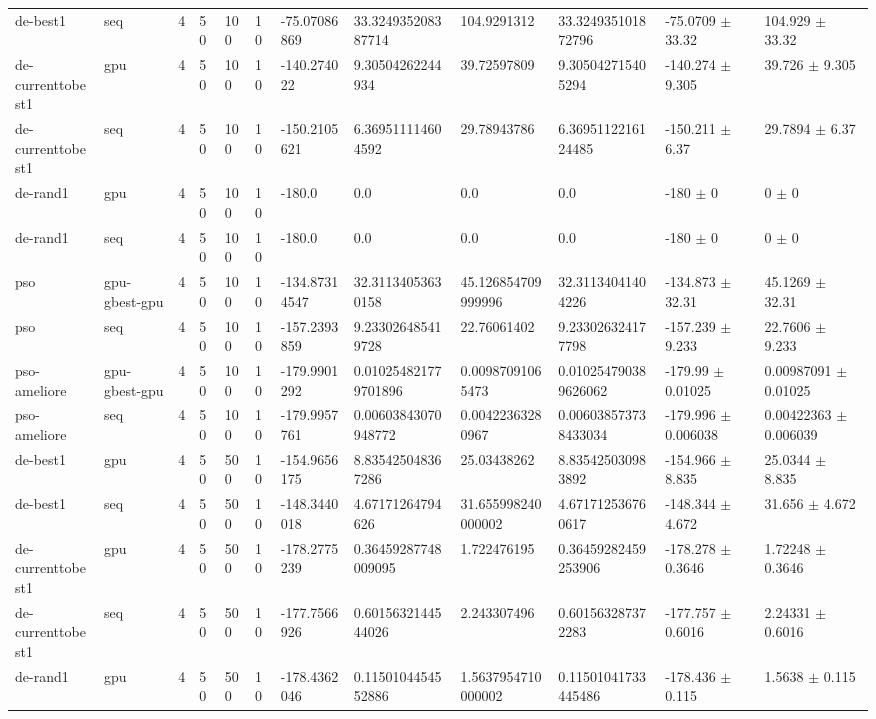 \begin{table}[t]
\begin{tabular}{llllllllllll}
de-best1 & seq & 4 & 50 & 100 & 10 & -75.07086869 & 33.324935208387714 & 104.9291312 & 33.324935101872796 & -75.0709 $\pm$ 33.32 & 104.929 $\pm$ 33.32 \\
de-currenttobest1 & gpu & 4 & 50 & 100 & 10 & -140.274022 & 9.30504262244934 & 39.72597809 & 9.305042715405294 & -140.274 $\pm$ 9.305 & 39.726 $\pm$ 9.305 \\
de-currenttobest1 & seq & 4 & 50 & 100 & 10 & -150.2105621 & 6.369511114604592 & 29.78943786 & 6.3695112216124485 & -150.211 $\pm$ 6.37 & 29.7894 $\pm$ 6.37 \\
de-rand1 & gpu & 4 & 50 & 100 & 10 & -180.0 & 0.0 & 0.0 & 0.0 & -180 $\pm$ 0 & 0 $\pm$ 0 \\
de-rand1 & seq & 4 & 50 & 100 & 10 & -180.0 & 0.0 & 0.0 & 0.0 & -180 $\pm$ 0 & 0 $\pm$ 0 \\
pso & gpu-gbest-gpu & 4 & 50 & 100 & 10 & -134.87314547 & 32.31134053630158 & 45.126854709999996 & 32.31134041404226 & -134.873 $\pm$ 32.31 & 45.1269 $\pm$ 32.31 \\
pso & seq & 4 & 50 & 100 & 10 & -157.2393859 & 9.233026485419728 & 22.76061402 & 9.233026324177798 & -157.239 $\pm$ 9.233 & 22.7606 $\pm$ 9.233 \\
pso-ameliore & gpu-gbest-gpu & 4 & 50 & 100 & 10 & -179.9901292 & 0.010254821779701896 & 0.00987091065473 & 0.010254790389626062 & -179.99 $\pm$ 0.01025 & 0.00987091 $\pm$ 0.01025 \\
pso-ameliore & seq & 4 & 50 & 100 & 10 & -179.9957761 & 0.00603843070948772 & 0.00422363280967 & 0.006038573738433034 & -179.996 $\pm$ 0.006038 & 0.00422363 $\pm$ 0.006039 \\
de-best1 & gpu & 4 & 50 & 500 & 10 & -154.9656175 & 8.835425048367286 & 25.03438262 & 8.835425030983892 & -154.966 $\pm$ 8.835 & 25.0344 $\pm$ 8.835 \\
de-best1 & seq & 4 & 50 & 500 & 10 & -148.3440018 & 4.67171264794626 & 31.655998240000002 & 4.671712536760617 & -148.344 $\pm$ 4.672 & 31.656 $\pm$ 4.672 \\
de-currenttobest1 & gpu & 4 & 50 & 500 & 10 & -178.2775239 & 0.36459287748009095 & 1.722476195 & 0.36459282459253906 & -178.278 $\pm$ 0.3646 & 1.72248 $\pm$ 0.3646 \\
de-currenttobest1 & seq & 4 & 50 & 500 & 10 & -177.7566926 & 0.6015632144544026 & 2.243307496 & 0.601563287372283 & -177.757 $\pm$ 0.6016 & 2.24331 $\pm$ 0.6016 \\
de-rand1 & gpu & 4 & 50 & 500 & 10 & -178.4362046 & 0.1150104454552886 & 1.5637954710000002 & 0.11501041733445486 & -178.436 $\pm$ 0.115 & 1.5638 $\pm$ 0.115 \\

\end{tabular}
\end{table}
